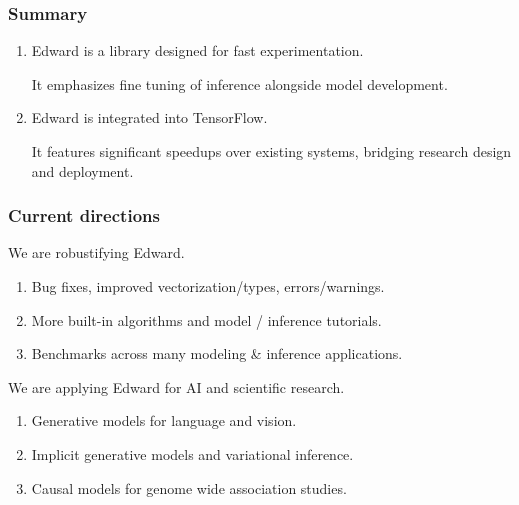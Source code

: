 \documentclass[10pt,
               xcolor={usenames,dvipsnames},
               hyperref={colorlinks,linktoc=all,citecolor=Plum,linkcolor=MidnightBlue,urlcolor=MidnightBlue},noamssymb]{beamer}
\begin{document}
\begin{frame}[c]
\frametitle{Summary}
\begin{enumerate}
\item
Edward is a library designed for fast experimentation.

It emphasizes fine tuning of inference alongside model development.
\item
Edward is integrated into TensorFlow.

It features significant speedups over existing systems, bridging
research design and deployment.
\end{enumerate}
\end{frame}

\begin{frame}
\frametitle{Current directions}

We are robustifying Edward.
\begin{enumerate}
\item Bug fixes, improved vectorization/types, errors/warnings.
\item More built-in algorithms and model / inference tutorials.
\item Benchmarks across many modeling \& inference applications.
\end{enumerate}
\vspace{3ex}

We are applying Edward for AI and scientific research.
\begin{enumerate}
\item
Generative models for language and vision.
\item
Implicit generative models and variational inference.
\item
Causal models for genome wide association studies. 
\end{enumerate}
\end{frame}
\end{document}
